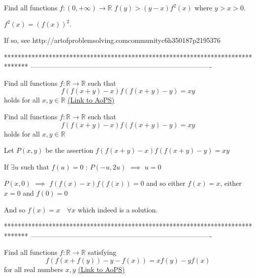 \begin{solution}
	\begin{tcolorbox}Find all functions $f:(0,+\infty)\to \mathbb{R}$
$f(y)>(y-x)f^2(x)$ where $y>x>0.$\end{tcolorbox}
\begin{tcolorbox}$f^2(x)=(f(x))^2.$\end{tcolorbox}

If so, see http://artofproblemsolving.com\/community\/c6h350187p2195376



\end{solution}
*******************************************************************************
-------------------------------------------------------------------------------

\begin{problem}
	Find all functions $ f: \mathbb{R} \to \mathbb{R} $ such that $$ f\left(f\left(x+y\right)-x\right)f\left(f\left(x+y\right)-y\right) = xy $$ holds for all $ x,y \in \mathbb{R} $
	\flushright \href{https://artofproblemsolving.com/community/c6h1606397}{(Link to AoPS)}
\end{problem}



\begin{solution}
	\begin{tcolorbox}Find all functions $ f: \mathbb{R} \to \mathbb{R} $ such that $$ f\left(f\left(x+y\right)-x\right)f\left(f\left(x+y\right)-y\right) = xy $$ holds for all $ x,y \in \mathbb{R} $\end{tcolorbox}
Let $P(x,y)$ be the assertion $f(f(x+y)-x)f(f(x+y)-y)=xy$

If $\exists u$ such that $f(u)=0$ :
$P(-u,2u)$ $\implies$ $u=0$

$P(x,0)$ $\implies$ $f(f(x)-x)f(f(x))=0$ and so either $f(x)=x$, either $x=0$ and $f(0)=0$

And so $\boxed{f(x)=x\quad\forall x}$ which indeed is a solution.


\end{solution}
*******************************************************************************
-------------------------------------------------------------------------------

\begin{problem}
	Find all functions $ f: \mathbb{R} \to \mathbb{R} $ satisfying $$ f\left(f\left(x+f\left(y\right)\right)-y-f\left(x\right)\right) = xf\left(y\right)-yf\left(x\right) $$ for all real numbers $ x,y $
	\flushright \href{https://artofproblemsolving.com/community/c6h1606398}{(Link to AoPS)}
\end{problem}



